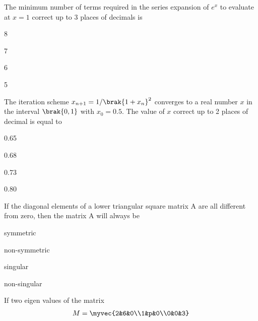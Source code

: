 \iffalse
    \title{Assignment}
    \author{EE24BTECH11035}
    \section{xe}
    \chapter{2007}
  \fi
    \item The minimum number of terms required in the series expansion of $e^x$ to evaluate at $x=1$ correct up to 3 places of decimals is
    \begin{enumerate}
        \begin{multicols}{4}
            \item 8
            \item 7
            \item 6
            \item 5
        \end{multicols}
    \end{enumerate}
    \bigskip
\item The iteration scheme $x_{n+1}=1/\brak{1+x_n}^2$ converges to a real number $x$ in the interval $\brak{0,1}$ with $x_0=0.5$. The value of $x$ correct up to 2 places of decimal is equal to
\begin{enumerate}
    \begin{multicols}{4}
        \item 0.65
        \item 0.68
        \item 0.73
        \item 0.80
    \end{multicols}
\end{enumerate}
\bigskip
\item If the diagonal elements of a lower triangular square matrix A are all different from zero, then the matrix A will always be
\begin{enumerate}
    \begin{multicols}{4}
        \item symmetric
        \item non-symmetric
        \item singular
        \item non-singular
    \end{multicols}
\end{enumerate}
\bigskip
\item If two eigen values of the matrix
\begin{align*}
    M=\myvec{2&6&0\\1&p&0\\0&0&3}
\end{align*}
